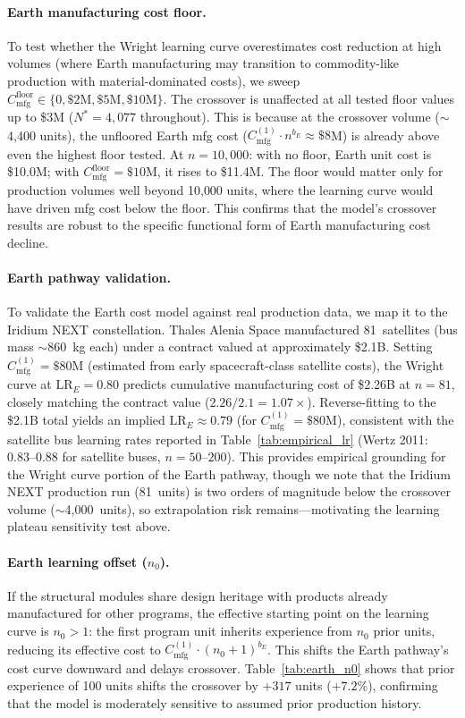\documentclass[preprint,12pt]{elsarticle}
\begin{document}
\paragraph{Earth manufacturing cost floor.} To test whether the Wright learning curve overestimates cost reduction at high volumes (where Earth manufacturing may transition to commodity-like production with material-dominated costs), we sweep $C_{\mathrm{mfg}}^{\mathrm{floor}} \in \{0, \$2\text{M}, \$5\text{M}, \$10\text{M}\}$. The crossover is unaffected at all tested floor values up to \$3M ($N^* = 4{,}077$ throughout). This is because at the crossover volume ($\sim$4{,}400 units), the unfloored Earth mfg cost ($C_{\mathrm{mfg}}^{(1)} \cdot n^{b_E} \approx \$8$M) is already above even the highest floor tested. At $n = 10{,}000$: with no floor, Earth unit cost is \$10.0M; with $C_{\mathrm{mfg}}^{\mathrm{floor}} = \$10$M, it rises to \$11.4M. The floor would matter only for production volumes well beyond 10{,}000 units, where the learning curve would have driven mfg cost below the floor. This confirms that the model's crossover results are robust to the specific functional form of Earth manufacturing cost decline.

\paragraph{Earth pathway validation.} To validate the Earth cost model against real production data, we map it to the Iridium NEXT constellation. Thales Alenia Space manufactured 81~satellites (bus mass $\sim$860~kg each) under a contract valued at approximately \$2.1B. Setting $C_{\mathrm{mfg}}^{(1)} = \$80$M (estimated from early spacecraft-class satellite costs), the Wright curve at $\mathrm{LR}_E = 0.80$ predicts cumulative manufacturing cost of \$2.26B at $n = 81$, closely matching the contract value ($2.26/2.1 = 1.07\times$). Reverse-fitting to the \$2.1B total yields an implied $\mathrm{LR}_E \approx 0.79$ (for $C_{\mathrm{mfg}}^{(1)} = \$80$M), consistent with the satellite bus learning rates reported in Table~\ref{tab:empirical_lr} (Wertz 2011: 0.83--0.88 for satellite buses, $n = 50$--$200$). This provides empirical grounding for the Wright curve portion of the Earth pathway, though we note that the Iridium NEXT production run (81~units) is two orders of magnitude below the crossover volume ($\sim$4{,}000~units), so extrapolation risk remains---motivating the learning plateau sensitivity test above.

\paragraph{Earth learning offset ($n_0$).} If the structural modules share design heritage with products already manufactured for other programs, the effective starting point on the learning curve is $n_0 > 1$: the first program unit inherits experience from $n_0$ prior units, reducing its effective cost to $C_{\mathrm{mfg}}^{(1)} \cdot (n_0 + 1)^{b_E}$. This shifts the Earth pathway's cost curve downward and delays crossover. Table~\ref{tab:earth_n0} shows that prior experience of 100 units shifts the crossover by $+317$ units ($+7.2\%$), confirming that the model is moderately sensitive to assumed prior production history.
\end{document}

